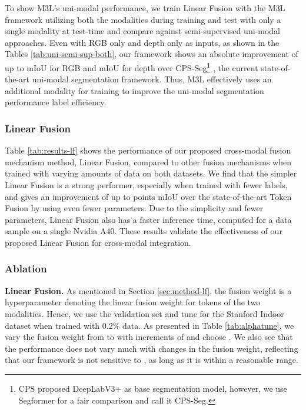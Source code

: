 \documentclass[10pt,twocolumn,letterpaper]{article}
\begin{document}
\label{sec:results-uni-semi-sup}

To show M3L's uni-modal performance, we train Linear Fusion with the M3L framework utilizing both the modalities during training and test with only a single modality at test-time and compare against semi-supervised uni-modal approaches. Even with RGB only and depth only as inputs, as shown in the Tables \ref{tab:uni-semi-sup-both}, our framework shows an absolute improvement of up to  mIoU for RGB and  mIoU for depth over CPS-Seg\footnote{\label{note:cps-seg}CPS\cite{chen2021-CPS} proposed DeepLabV3+\cite{chen2017rethinking} as base segmentation model, however, we use Segformer \cite{segformer} for a fair comparison and call it CPS-Seg.} \cite{chen2021-CPS}, the current state-of-the-art uni-modal segmentation framework. Thus, M3L effectively uses an additional modality for training to improve the uni-modal segmentation performance label efficiency.



\subsubsection{Linear Fusion}
\label{sec:results-lf}

Table \ref{tab:results-lf} shows the performance of our proposed cross-modal fusion mechanism method, Linear Fusion, compared to other fusion mechanisms when trained with varying amounts of data on both datasets. We find that the simpler Linear Fusion is a strong performer, especially when trained with fewer labels, and gives an improvement of up to  points mIoU over the state-of-the-art Token Fusion \cite{tokenfusion} by using even fewer parameters. Due to the simplicity and fewer parameters, Linear Fusion also has a faster inference time, computed for a data sample on a single Nvidia A40. These results validate the effectiveness of our proposed Linear Fusion for cross-modal integration.


\subsubsection{Ablation}
\label{sec:results-ablation}
\noindent\textbf{Linear Fusion.}
As mentioned in Section \ref{sec:method-lf}, the fusion weight  is a hyperparameter denoting the linear fusion weight for tokens of the two modalities. Hence, we use the validation set and tune  for the Stanford Indoor dataset \cite{stanfordindoor} when trained with 0.2\% data. As presented in Table \ref{tab:alphatune}, we vary the fusion weight from  to  with increments of  and choose . We also see that the performance does not vary much with changes in the fusion weight, reflecting that our framework is not sensitive to , as long as it is within a reasonable range.
\end{document}
